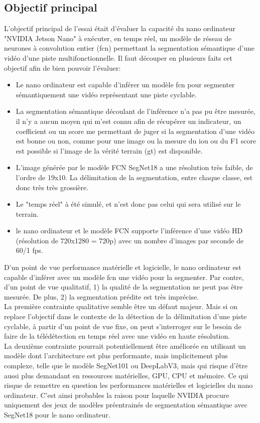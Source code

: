 ﻿\subsection{Objectif principal}
\noindent L'objectif principal de l'essai était d'évaluer la capacité du nano ordinateur "NVIDIA Jetson Nano" à exécuter, en temps réel, un modèle de réseau de neurones à convolution entier (\acrshort{fcn}) permettant la segmentation sémantique d'une vidéo d'une piste multifonctionnelle. Il faut découper en plusieurs faits cet objectif afin de bien pouvoir l'évaluer: 
\begin{itemize}
   \item Le nano ordinateur est capable d'inférer un modèle \acrshort{fcn} pour segmenter sémantiquement une vidéo représentant une piste cyclable. 
   \item La segmentation sémantique découlant de l'inférence n'a pas pu être mesurée, il n'y a aucun moyen qui m'est connu afin de récupérer un indicateur, un coefficient ou un score me permettant de juger si la segmentation d'une vidéo est bonne ou non, comme pour une image ou la mesure du \acrshort{iou} ou du F1 score est possible si l'image de la vérité terrain (\acrshort{gt}) est disponible. 
   \item L'image générée par le modèle FCN SegNet18 a une résolution très faible, de l'ordre de 19x10. La délimitation de la segmentation, entre chaque classe, est donc très très grossière.
   \item Le "temps réel" à été simulé, et n'est donc pas celui qui sera utilisé sur le terrain. 
   \item le nano ordinateur et le modèle FCN supporte l'inférence d'une vidéo HD (résolution de 720x1280 = 720p) avec un nombre d'images par seconde de 60/1 \acrshort{fps}.
\end{itemize}   
\vspace{\baselineskip}
\noindent D'un point de vue performance matérielle et logicielle, le nano ordinateur est capable d'inférer avec un modèle \acrshort{fcn} une vidéo pour la segmenter. Par contre, d'un point de vue qualitatif, 1) la qualité de la segmentation ne peut pas être mesurée. De plus, 2) la segmentation prédite est très imprécise.
\vspace{\baselineskip}
\\
\noindent La première contrainte qualitative semble être un défaut majeur. Mais si on replace l'objectif dans le contexte de la détection de la délimitation d'une piste cyclable, à partir d'un point de vue fixe, on peut s'interroger sur le besoin de faire de la télédétection en temps réel avec une vidéo en haute résolution.
\vspace{\baselineskip}
\\
\noindent La deuxième  contrainte pourrait potentiellement être améliorée en utilisant un modèle dont l'architecture est plus performante, mais implicitement plus complexe, telle que le modèle SegNet101 ou DeepLabV3, mais qui risque d'être aussi plus demandant en ressources matérielles, GPU, CPU et mémoire. Ce qui risque de remettre en question les performances matérielles et logicielles du nano ordinateur. C'est ainsi probables la raison pour laquelle NVIDIA procure uniquement des jeux de modèles préentrainés de segmentation sémantique avec SegNet18 pour le nano ordinateur. 
